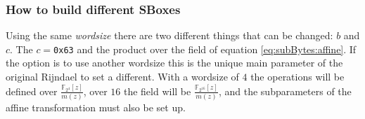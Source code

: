 \documentclass[10pt,a4paper,twoside]{llncs}
\newcommand{\Fpn}[2]{\ensuremath{\mathbb{F}_{#1^#2}}}
\newcommand{\Fpnm}[2]{\ensuremath{\frac{\Fpn{2}{#1}[#2]}{m(#2)}}}
\begin{document}
\subsubsection{How to build different SBoxes}\label{sec:sbox}

Using the same \emph{wordsize} there are two different things that can be changed: $b$ and $c$. The $c=$\texttt{0x63} and the product over the field of equation \ref{eq:subBytes:affine}. If the option is to use another wordsize this is the unique main parameter of the original Rijndael to set a different. With a wordsize of $4$ the operations will be defined over \Fpnm{4}{z}, over $16$ the field will be \Fpnm{{16}}{z}, and the subparameters of the affine transformation must also be set up.
\end{document}

